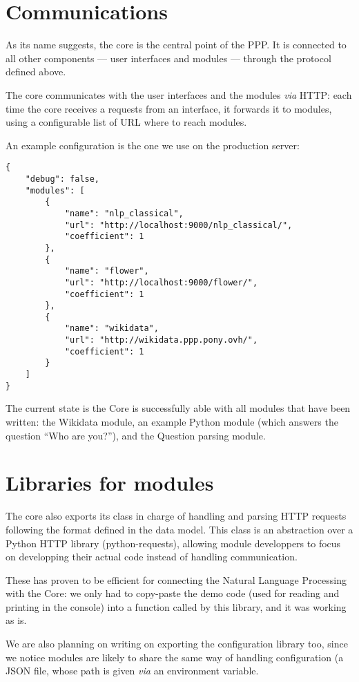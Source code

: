 \section{Communications}

As its name suggests, the core is the central point of the PPP. It is
connected to all other components — user interfaces and modules — through
the protocol defined above.

The core communicates with the user interfaces and the modules {\em via} HTTP:
each time the core receives a requests from an interface, it forwards it
to modules, using a configurable list of URL where to reach modules.

An example configuration is the one we use on the production server:

\begin{verbatim}
{
    "debug": false,
    "modules": [
        {
            "name": "nlp_classical",
            "url": "http://localhost:9000/nlp_classical/",
            "coefficient": 1
        },
        {
            "name": "flower",
            "url": "http://localhost:9000/flower/",
            "coefficient": 1
        },
        {
            "name": "wikidata",
            "url": "http://wikidata.ppp.pony.ovh/",
            "coefficient": 1
        }
    ]
}
\end{verbatim}

The current state is the Core is successfully able with all modules
that have been written: the Wikidata module, an example Python module
(which answers the question  “Who are you?”), and the Question parsing module.

\section{Libraries for modules}

The core also exports its class in charge of handling and parsing HTTP
requests following the format defined in the data model.
This class is an abstraction over a Python HTTP library (python-requests),
allowing module developpers to focus on developping their actual code
instead of handling communication.

These has proven to be efficient for connecting the Natural Language
Processing with the Core: we only had to copy-paste the demo code
(used for reading and printing in the console) into a function called
by this library, and it was working as is.


We are also planning on writing on exporting the configuration
library too, since we notice modules are likely to share the
same way of handling configuration (a JSON file, whose path
is given {\em via} an environment variable.


